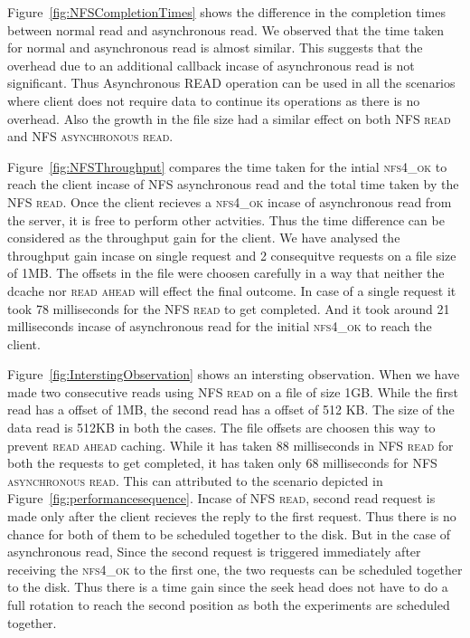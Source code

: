 Figure~\ref{fig:NFSCompletionTimes} shows the  difference in the completion times between normal read and asynchronous read. We observed that the time taken for normal and asynchronous read is almost similar. This suggests that the overhead due to an additional callback incase of asynchronous read is not significant. Thus Asynchronous READ operation can be used in all the scenarios where client does not require data to continue its operations as there is no overhead. Also the growth in the file size had a similar effect on both \textsc{NFS read} and \textsc{NFS asynchronous read}.


Figure~\ref{fig:NFSThroughput} compares the  time taken for the intial \textsc{nfs4\_ok} to reach the client incase of NFS asynchronous read and the total time taken by the \textsc{NFS read}.
Once the client recieves a \textsc{nfs4\_ok}  incase of asynchronous read from the server, it is free to perform other actvities. Thus the time difference can be considered as the throughput gain for the client. We have analysed the throughput gain incase on single request and 2 consequitve requests on a file size of 1MB. The offsets in the file were choosen carefully in a way that neither the dcache nor \textsc{read ahead} will effect the final outcome. In case of a single request it took 78 milliseconds for the 
\textsc{NFS read} to get completed. And it took around 21 milliseconds incase of asynchronous read for the initial \textsc{nfs4\_ok}  to reach the client. 



 Figure~\ref{fig:InterstingObservation} shows an intersting observation. When we have made two consecutive reads  using \textsc{NFS read} on a file of size 1GB. While the first read has a offset of 1MB, the second read has a offset of 512 KB. The size of the data read is 512KB in both the cases. The file offsets are choosen this way to prevent \textsc{read ahead} caching. While it has taken 88 milliseconds  in \textsc{NFS read} for both the requests to get completed, it has taken only 68 milliseconds for \textsc{NFS asynchronous read}. This can attributed to the scenario depicted  in   Figure~\ref{fig:performancesequence}. Incase of \textsc{NFS read}, second read request is made only after the client recieves the reply to the first request. Thus there is no chance for both of them to be scheduled together to the disk. But in the case of asynchronous read, Since the second request is triggered immediately after receiving the  \textsc{nfs4\_ok}  to the first one, the two requests can be scheduled together to the disk. Thus there is a time gain since the seek head does not have to do a full rotation to reach the second position as both the experiments are scheduled together.    






